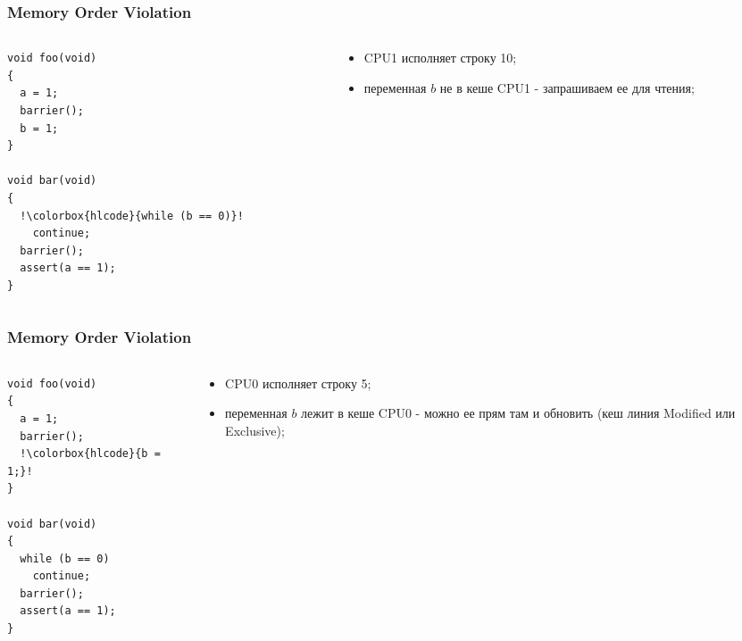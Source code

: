 \begin{frame}[fragile]
\frametitle{Memory Order Violation}

\begin{columns}[T]
  \begin{column}{.4\linewidth}
    \begin{lstlisting}[escapechar=!]
void foo(void)
{
  a = 1;
  barrier();
  b = 1;
}

void bar(void)
{
  !\colorbox{hlcode}{while (b == 0)}!
    continue;
  barrier();
  assert(a == 1);
}
    \end{lstlisting}
  \end{column}
  \begin{column}{.6\linewidth}
    \begin{itemize}
      \item CPU1 исполняет строку 10;
      \item переменная $b$ не в кеше CPU1 - запрашиваем ее для чтения;
    \end{itemize}
  \end{column}
\end{columns}
\end{frame}

\begin{frame}[fragile]
\frametitle{Memory Order Violation}

\begin{columns}[T]
  \begin{column}{.4\linewidth}
    \begin{lstlisting}[escapechar=!]
void foo(void)
{
  a = 1;
  barrier();
  !\colorbox{hlcode}{b = 1;}!
}

void bar(void)
{
  while (b == 0)
    continue;
  barrier();
  assert(a == 1);
}
    \end{lstlisting}
  \end{column}
  \begin{column}{.6\linewidth}
    \begin{itemize}
      \item CPU0 исполняет строку 5;
      \item переменная $b$ лежит в кеше CPU0 - можно ее прям там и обновить
            (кеш линия Modified или Exclusive);
    \end{itemize}
  \end{column}
\end{columns}
\end{frame}

